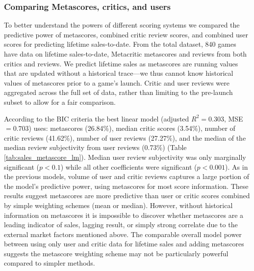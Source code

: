 \documentclass[letterpaper]{article}
\begin{document}
\subsubsection{Comparing Metascores, critics, and users}
To better understand the powers of different scoring systems we compared the predictive power of metascores, combined critic review scores, and combined user scores for predicting lifetime sales-to-date. From the total dataset, 840 games have data on lifetime sales-to-date, Metacritic metascores and reviews from both critics and reviews. We predict lifetime sales as metascores are running values that are updated without a historical trace---we thus cannot know historical values of metascores prior to a game's launch. Critic and user reviews were aggregated across the full set of data, rather than limiting to the pre-launch subset to allow for a fair comparison.

According to the BIC criteria the best linear model (adjusted $R^2 = 0.303$, MSE $= 0.703$) uses: metascores (26.84\%), median critic scores (3.54\%), number of critic reviews (41.62\%), number of user reviews (27.27\%), and the median of the median review subjectivity from user reviews (0.73\%) (Table \ref{tab:sales_metascore_lm}). Median user review subjectivity was only marginally significant ($p < 0.1$) while all other coefficients were significant ($p < 0.001$). As in the previous models, volume of user and critic reviews captures a large portion of the model's predictive power, using metascores for most score information. These results suggest metascores are more predictive than user or critic scores combined by simple weighting schemes (mean or median). However, without historical information on metascores it is impossible to discover whether metascores are a leading indicator of sales, lagging result, or simply strong correlate due to the external market factors mentioned above. The comparable overall model power between using only user and critic data for lifetime sales and adding metascores suggests the metascore weighting scheme may not be particularly powerful compared to simpler methods.
\end{document}
